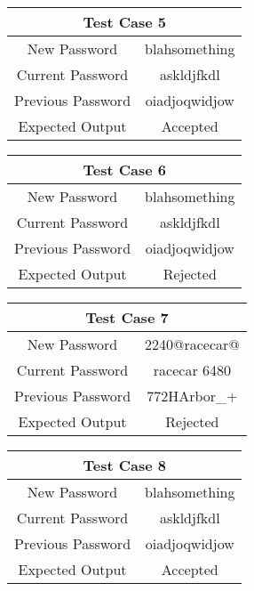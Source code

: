 \documentclass[12pt,letterpaper]{article}
\begin{document}
\begin{table}[h]
\begin{centering}
\begin{tabular}{||c|c||}
  \hline
  \multicolumn{2}{||c||}{Test Case 5} \\
  \hline
  New Password & blahsomething \\
  \hline
  Current Password & askldjfkdl \\
  \hline
  Previous Password & oiadjoqwidjow \\
  \hline
  Expected Output & Accepted \\
  \hline
  \end{tabular}
  \begin{tabular}{||c|c||}
  \hline
  \multicolumn{2}{||c||}{Test Case 6} \\
  \hline
  New Password & blahsomething \\
  \hline
  Current Password & askldjfkdl \\
  \hline
  Previous Password & oiadjoqwidjow \\
  \hline
  Expected Output & Rejected \\
  \hline
  \end{tabular}
  \begin{tabular}{||c|c||}
  \hline
  \multicolumn{2}{||c||}{Test Case 7} \\
  \hline
  New Password & 2240@racecar@ \\
  \hline
  Current Password & racecar 6480 \\
  \hline
  Previous Password & 772HArbor\_+ \\
  \hline
  Expected Output & Rejected \\
  \hline
  \end{tabular}
  \begin{tabular}{||c|c||}
  \hline
  \multicolumn{2}{||c||}{Test Case 8} \\
  \hline
  New Password & blahsomething \\
  \hline
  Current Password & askldjfkdl \\
  \hline
  Previous Password & oiadjoqwidjow \\
  \hline
  Expected Output & Accepted \\
  \hline
  \end{tabular}




\end{centering}


\end{table}
\end{document}
